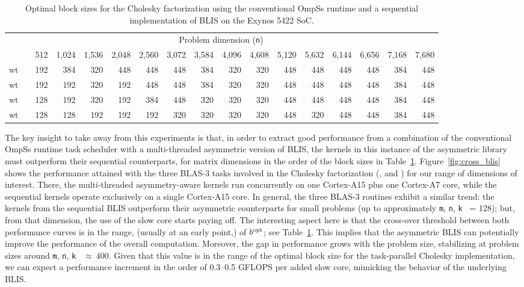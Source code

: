 \begin{table}
	\centering
	\caption{Optimal block sizes for the Cholesky factorization using the conventional 
                 OmpSs runtime and a sequential implementation of BLIS on the Exynos 5422 SoC.}
	\label{tab:optimal_bs_sym}
{\scriptsize
\begin{tabular}{crrrrrrrrrrrrrrrr} 
\toprule
  & \phantom{a} & \multicolumn{14}{c}{Problem dimension ({\tt n})} \\ 
\cmidrule{3-17} 
  & \phantom{a} &     512 & 1,024 & 1,536 & 2,048 & 2,560 & 3,072 & 3,584 & 4,096 & 4,608 & 5,120 & 5,632 & 6,144 & 6,656 & 7,168 & 7,680 \\ \hline

{\sc 1 wt} & \phantom{a} &     192 & 384  & 320  & 448  & 448  & 448  & 384  & 320 & 320 & 448 & 448 & 448 & 448 & 384 & 448 \\ \hline
{\sc 2 wt} & \phantom{a} &     192 & 192  & 320  & 192  & 448  & 448  & 384  & 320 & 320 & 448 & 448 & 448 & 448 & 384 & 448 \\ \hline
{\sc 3 wt} & \phantom{a} &     128 & 192  & 320  & 192  & 384  & 448  & 320  & 320 & 320 & 448 & 448 & 448 & 448 & 384 & 448 \\ \hline
{\sc 4 wt} & \phantom{a} &     128 & 128  & 192  & 192  & 192  & 320  & 320  & 320 & 320 & 448 & 320 & 448 & 448 & 384 & 448 \\ \bottomrule
\end{tabular}
}
\end{table}

The key insight to take away from this experiments is that,
in order to extract good performance from a combination of the conventional OmpSs runtime task scheduler 
with a multi-threaded asymmetric version of BLIS, the kernels in this instance of the asymmetric library must outperform
their sequential counterparts, for matrix dimensions in the order of the block sizes in Table~\ref{tab:optimal_bs_sym}.  
Figure~\ref{fig:cross_blis} shows the performance attained
with the three BLAS-3 tasks involved in the Cholesky factorization (\gemm, \syrk and \trsm) for our range of dimensions of interest. 
There, the multi-threaded asymmetry-aware kernels run concurrently on one Cortex-A15 plus one Cortex-A7 core, while
the sequential kernels operate exclusively on a single Cortex-A15 core. 
In general, the three BLAS-3 routines exhibit a similar trend: the kernels from the sequential BLIS
outperform their asymmetric counterparts for small problems (up to 
approximately {\tt m}, {\tt n}, {\tt k } = 128); but,
from that dimension, the use of the slow core starts paying off. The interesting aspect here is that
the cross-over threshold between both performance curves is in the range, (usually at an early point,) 
of $b^{\mbox{\rm \scriptsize opt}}$; see Table~\ref{tab:optimal_bs_sym}. This implies 
that the asymmetric BLIS can potentially improve the performance of the overall computation. 
Moreover, the gap in performance grows with the problem size, 
stabilizing at problem sizes around {\tt m}, {\tt n}, {\tt k } $\approx~400$. 
Given that this value is in the range of the optimal block size for the task-parallel Cholesky implementation, 
we can expect a performance increment in the order of 0.3--0.5 GFLOPS per added slow core, 
mimicking the behavior of the underlying BLIS.

